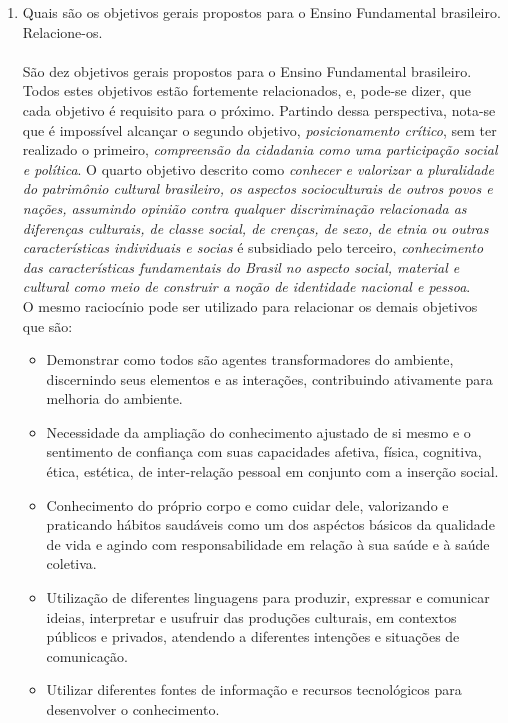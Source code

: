 \documentclass[a4paper, 12pt]{article}
\begin{document}
\begin{enumerate}
\item Quais são os objetivos gerais propostos para o Ensino Fundamental brasileiro. Relacione-os. \\ \\
  São dez objetivos gerais propostos para o Ensino Fundamental brasileiro. Todos estes objetivos estão fortemente relacionados, e, pode-se dizer, que cada objetivo é requisito para o próximo. Partindo dessa perspectiva, nota-se que é impossível alcançar o segundo objetivo, \emph{posicionamento crítico}, sem ter realizado o primeiro, \emph{compreensão da cidadania como uma participação social e política}.  O quarto objetivo descrito como \emph{conhecer e valorizar a pluralidade do patrimônio cultural brasileiro, os aspectos socioculturais de outros povos e nações, assumindo opinião contra qualquer discriminação relacionada as diferenças culturais, de classe social, de crenças, de sexo, de etnia ou outras características individuais e socias} é subsidiado pelo terceiro, \emph{conhecimento das características fundamentais do Brasil no aspecto social, material e cultural como meio de construir a noção de identidade nacional e pessoa}. \\
  O mesmo raciocínio pode ser utilizado para relacionar os demais objetivos que são: \\
  \begin{itemize}
  \item Demonstrar como todos são agentes transformadores do ambiente, discernindo seus elementos e as interações, contribuindo ativamente para melhoria do ambiente.
  \item Necessidade da ampliação do conhecimento ajustado de si mesmo e o sentimento de confiança com suas capacidades afetiva, física, cognitiva, ética, estética, de inter-relação pessoal em conjunto com a inserção social.
  \item Conhecimento do próprio corpo e como cuidar dele, valorizando e praticando hábitos saudáveis como um dos aspéctos básicos da qualidade de vida e agindo com responsabilidade em relação à sua saúde e à saúde coletiva.
  \item Utilização de diferentes linguagens para produzir, expressar e comunicar ideias, interpretar e usufruir das produções culturais, em contextos públicos e privados, atendendo a diferentes intenções e situações de comunicação.
  \item Utilizar diferentes fontes de informação e recursos tecnológicos para desenvolver o conhecimento.

\end{itemize}
\end{enumerate}
\end{document}

